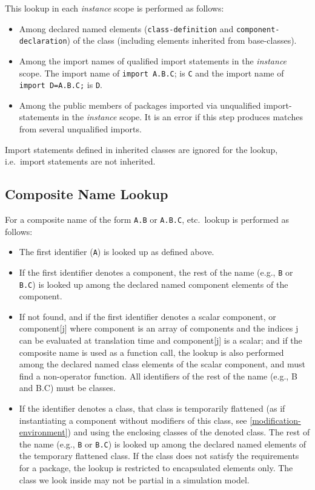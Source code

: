 This lookup in each \emph{instance} scope is performed as follows:
\begin{itemize}
\item
  Among declared named elements (\lstinline!class-definition! and
  \lstinline!component-declaration!) of the class (including elements inherited from
  base-classes).
\item
  Among the import names of qualified import statements in the
  \emph{instance} scope. The import name of \lstinline!import A.B.C!; is \lstinline!C! and the
  import name of \lstinline!import D=A.B.C;! is \lstinline!D!.
\item
  Among the public members of packages imported via unqualified
  import-statements in the \emph{instance} scope. It is an error if
  this step produces matches from several unqualified imports.
\end{itemize}

Import statements defined in inherited classes are ignored for the lookup, i.e.\ import statements are not inherited.

\subsection{Composite Name Lookup}\label{composite-name-lookup}

For a composite name of the form \lstinline!A.B! or \lstinline!A.B.C!, etc.\ lookup is performed as follows:
\begin{itemize}
\item
  The first identifier (\lstinline!A!) is looked up as defined above.
\item
  If the first identifier denotes a component, the rest of the name
  (e.g., \lstinline!B! or \lstinline!B.C!) is looked up among the declared named component
  elements of the component.
\item
  If not found, and if the first identifier denotes a scalar component,
  or component[j] where component is an array of components and the
  indices j can be evaluated at translation time and component[j] is
  a scalar; and if the composite name is used as a function call, the
  lookup is also performed among the declared named class elements of
  the scalar component, and must find a non-operator function. All
  identifiers of the rest of the name (e.g., B and B.C) must be
  classes.
\item
  If the identifier denotes a class, that class is temporarily flattened
  (as if instantiating a component without modifiers of this class, see
  \cref{modification-environment}) and using the enclosing classes of the denoted class.
  The rest of the name (e.g., \lstinline!B! or \lstinline!B.C!) is looked up among the
  declared named elements of the temporary flattened class. If the class
  does not satisfy the requirements for a package, the lookup is
  restricted to encapsulated elements only. The class we look inside may
  not be partial in a simulation model.
\end{itemize}

